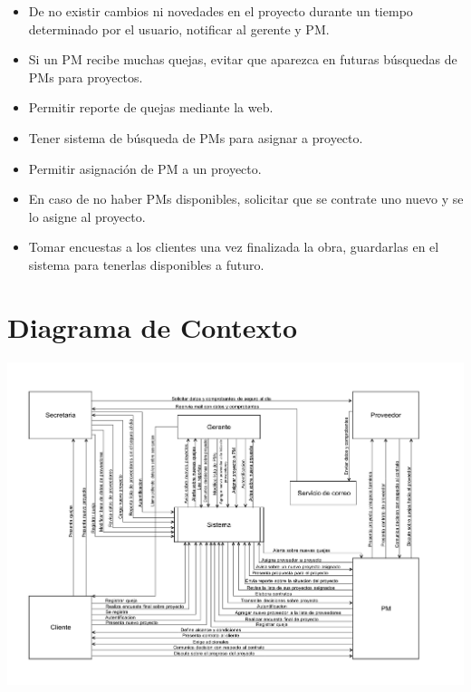 \documentclass{article}
\theoremstyle{definition}
\theoremstyle{remark}
\begin{document}
\begin{itemize}
    \item De no existir cambios ni novedades en el proyecto durante un tiempo determinado por el usuario, notificar al gerente y PM.
    \item Si un PM recibe muchas quejas, evitar que aparezca en futuras búsquedas de PMs para proyectos.
    \item Permitir reporte de quejas mediante la web.
    \item Tener sistema de búsqueda de PMs para asignar a proyecto.
    \item Permitir asignación de PM a un proyecto.
    \item En caso de no haber PMs disponibles, solicitar que se contrate uno nuevo y se lo asigne al proyecto.
    \item Tomar encuestas a los clientes una vez finalizada la obra, guardarlas en el sistema para tenerlas disponibles a futuro.
\end{itemize}

\section{Diagrama de Contexto}

\includegraphics[width=\textheight/10*9,height=\textwidth,angle=90]{images/contexto.pdf}
\end{document}
